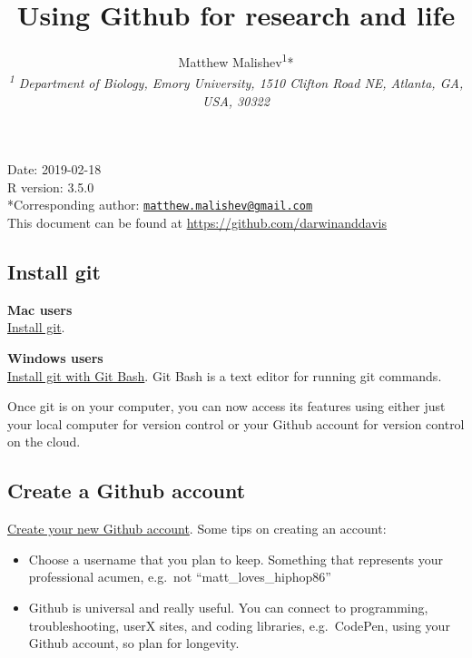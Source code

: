 \documentclass[10,portrait]{article}
\title{Using Github for research and life}
\author{Matthew
Malishev\textsuperscript{1}*\\[2\baselineskip]\emph{\textsuperscript{1}
Department of Biology, Emory University, 1510 Clifton Road NE, Atlanta,
GA, USA, 30322}}
\date{}
\providecommand{\tightlist}{%
  \setlength{\itemsep}{0pt}\setlength{\parskip}{0pt}}
\begin{document}
\maketitle

{
\hypersetup{linkcolor=black}
\setcounter{tocdepth}{4}
\tableofcontents
}
\newpage   

Date: 2019-02-18\\
R version: 3.5.0\\
*Corresponding author:
\href{mailto:matthew.malishev@gmail.com}{\nolinkurl{matthew.malishev@gmail.com}}\\
This document can be found at \url{https://github.com/darwinanddavis}\\
\newpage  

\subsection{Install git}\label{install-git}

\textbf{Mac users}\\
\href{https://git-scm.com/book/en/v2/Getting-Started-Installing-Git}{Install
git}.

\textbf{Windows users}\\
\href{https://www.sitereq.com/post/easiest-way-to-install-git-bash-commands-on-windows\#git-bash-windows-installation}{Install
git with Git Bash}. Git Bash is a text editor for running git commands.

Once git is on your computer, you can now access its features using
either just your local computer for version control or your Github
account for version control on the cloud.

\subsection{Create a Github account}\label{create-a-github-account}

\href{https://github.com/}{Create your new Github account}. Some tips on
creating an account:

\begin{itemize}
\tightlist
\item
  Choose a username that you plan to keep. Something that represents
  your professional acumen, e.g.~not ``matt\_loves\_hiphop86''\\
  \hspace*{0.333em}
\item
  Github is universal and really useful. You can connect to programming,
  troubleshooting, userX sites, and coding libraries, e.g.~CodePen,
  using your Github account, so plan for longevity.\\
  \hspace*{0.333em}
\end{itemize}
\end{document}
